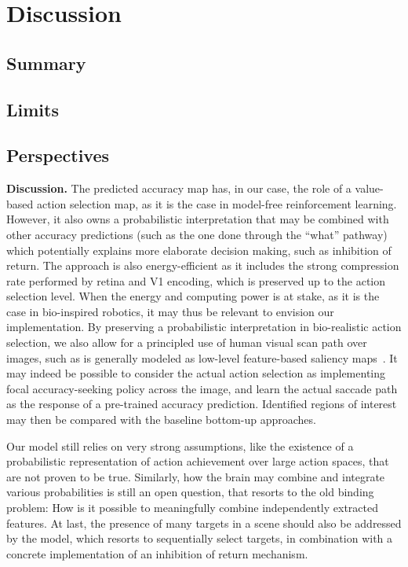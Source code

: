 \CNS
\section{Discussion}
\label{sec:discussion}

\subsection{Summary}

\subsection{Limits}

\subsection{Perspectives}
\else
\textbf{Discussion. }
The predicted accuracy map has, in our case, the role of a value-based action selection map, as it is the case in model-free reinforcement learning. However, it also owns a probabilistic interpretation that may be combined with other accuracy predictions (such as the one done through the ``what'' pathway) which potentially explains more elaborate decision making, such as inhibition of return. The approach is also energy-efficient as it includes the strong compression rate performed by retina and V1 encoding, which is preserved up to the action selection level. When the energy and computing power is at stake, as it is the case in bio-inspired robotics, it may thus be relevant to envision our implementation. By preserving a probabilistic interpretation in bio-realistic action selection, we also allow for a principled use of human visual scan path over images, such as is generally modeled as low-level feature-based saliency maps~\citep{Itti01}. It may indeed be possible to consider the actual action selection as implementing focal accuracy-seeking policy across the image, and learn the actual saccade path as the response of a pre-trained accuracy prediction. Identified regions of interest may then be compared with the baseline bottom-up approaches.

Our model still relies on very strong assumptions, like the existence of a probabilistic representation of action achievement over large action spaces, that are not proven to be true. Similarly, how the brain may combine and integrate various probabilities is still an open question, that resorts to the old binding problem: How is it possible to meaningfully combine independently extracted features. At last, the presence of many targets in a scene should also be addressed by the model, which resorts to sequentially select targets, in combination with a concrete implementation of an inhibition of return mechanism.   

\fi

